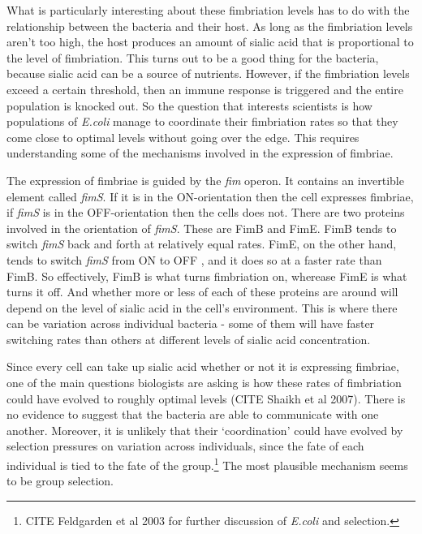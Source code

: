 \documentclass[11pt]{article}
\begin{document}
What is particularly interesting about these fimbriation levels has to do with the relationship between the bacteria and their host. As long as the fimbriation levels aren't too high, the host produces an amount of sialic acid that is proportional to the level of fimbriation. This turns out to be a good thing for the bacteria, because sialic acid can be a source of nutrients. However, if the fimbriation levels exceed a certain threshold, then an immune response is triggered and the entire population is knocked out. So the question that interests scientists is how populations of \emph{E.coli} manage to coordinate their fimbriation rates so that they come close to optimal levels without going over the edge. This requires understanding some of the mechanisms involved in the expression of fimbriae.

The expression of fimbriae is guided by the \emph{fim} operon. It contains an invertible element called \emph{fimS}. If it is in the ON-orientation then the cell expresses fimbriae, if \emph{fimS} is in the OFF-orientation then the cells does not. There are two proteins involved in the orientation of \emph{fimS}. These are FimB and FimE. FimB tends to switch \emph{fimS} back and forth at relatively equal rates. FimE, on the other hand, tends to switch \emph{fimS} from ON to OFF , and it does so at a faster rate than FimB.  So effectively, FimB is what turns fimbriation on, wherease FimE is what turns it off.  And whether more or less of each of these proteins are around will depend on the level of sialic acid in the cell's environment.  This is where there can be variation across individual bacteria - some of them will have faster switching rates than others at different levels of sialic acid concentration.

Since every cell can take up sialic acid whether or not it is expressing fimbriae, one of the main questions biologists are asking is how these rates of fimbriation could have evolved to roughly optimal levels (CITE Shaikh et al 2007).  There is no evidence to suggest that the bacteria are able to communicate with one another. Moreover, it is unlikely that their `coordination' could have evolved by selection pressures on variation across individuals, since the fate of each individual is tied to the fate of the group.\footnote{CITE Feldgarden et al 2003 for further discussion of \emph{E.coli} and selection.} The most plausible mechanism seems to be group selection.
\end{document}
